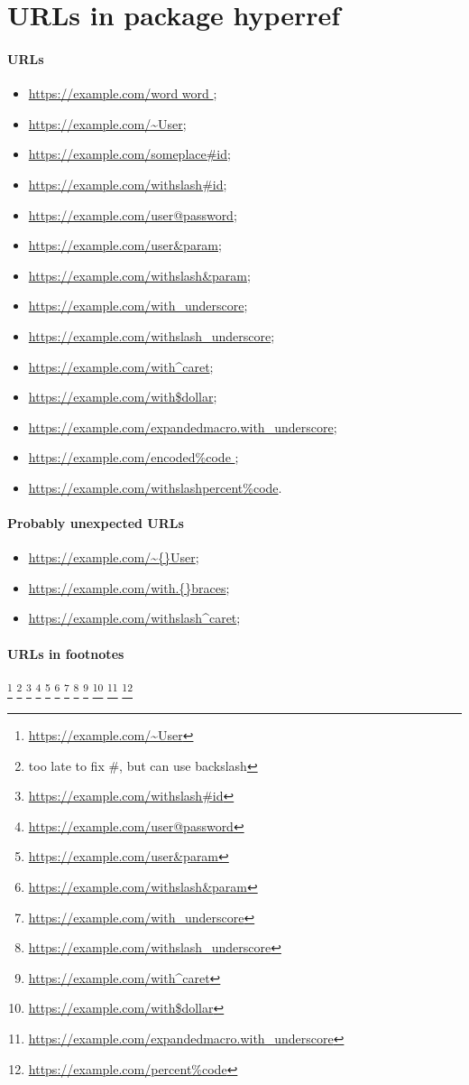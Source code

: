 \documentclass{article}
\def\macro{with_underscore}%
\begin{document}
\section{URLs in package hyperref}

\paragraph{URLs}
\begin{itemize}
\item\url{  https://example.com/word word };
\item\url{https://example.com/~User};
\item\url{https://example.com/someplace#id};
\item\url{https://example.com/withslash\#id};
\item\url{https://example.com/user@password};
\item\url{https://example.com/user&param};
\item\url{https://example.com/withslash\&param};
\item\url{https://example.com/with_underscore};
\item\url{https://example.com/withslash\_underscore};
\item\url{https://example.com/with^caret};
\item\url{https://example.com/with$dollar};
\item\url{https://example.com/expandedmacro.\macro};
\item\url{https://example.com/encoded%
};
\item\url{https://example.com/withslashpercent\%code}.
\end{itemize}

\paragraph{Probably unexpected URLs}
\begin{itemize}
\item\url{https://example.com/\~{}User};
\item\url{https://example.com/with.{}braces};
\item\url{https://example.com/withslash\^caret};
\end{itemize}

\paragraph{URLs in footnotes}
\footnote{\url{https://example.com/~User}}
\footnote{too late to fix \#, but can use backslash}
\footnote{\url{https://example.com/withslash\#id}}
\footnote{\url{https://example.com/user@password}}
\footnote{\url{https://example.com/user&param}}
\footnote{\url{https://example.com/withslash\&param}}
\footnote{\url{https://example.com/with_underscore}}
\footnote{\url{https://example.com/withslash\_underscore}}
\footnote{\url{https://example.com/with^caret}}
\footnote{\url{https://example.com/with$dollar}}
\footnote{\url{https://example.com/expandedmacro.\macro}}
\footnote{\url{https://example.com/percent\%code}}
\end{document}
